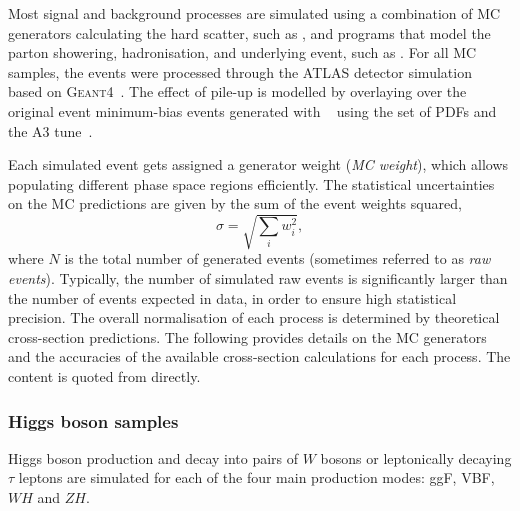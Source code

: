 Most signal and background processes are simulated using a combination of MC generators calculating the hard scatter, such as \Powheg, and programs that model the parton showering, hadronisation, and underlying event, such as \PythiaEight.
For all MC samples, the events were processed through the ATLAS detector simulation~\cite{SOFT-2010-01} based on
\textsc{Geant4}~\cite{Agostinelli:2002hh}.\cite{PLACEHOLDER:FOR:PAPER} 
The effect of pile-up is modelled by overlaying over the original event minimum-bias events generated with ~\cite{Sjostrand:2007gs} using the \nnpdftwo set of PDFs and the A3 tune~\cite{ATL-PHYS-PUB-2016-017}.


Each simulated event gets assigned a generator weight (\emph{MC weight}), which allows populating different phase space regions efficiently.
The statistical uncertainties on the MC predictions are given by the sum of the event weights squared,
\begin{equation}
    \sigma = \sqrt{\sum_i w_i^2},
\end{equation}
where $N$ is the total number of generated events (sometimes referred to as \emph{raw events}). Typically, the number of simulated raw events is significantly larger than the number of events expected in data, in order to ensure high statistical precision. 
The overall normalisation of each process is determined by theoretical cross-section predictions.
The following provides details on the MC generators and the accuracies of the available cross-section calculations for each process. The content is quoted from \cite{PLACEHOLDER:FOR:PAPER} directly.


\subsubsection{Higgs boson samples}
Higgs boson production and decay into pairs of $W$ bosons or leptonically decaying $\tau$ leptons are simulated for each of the four main production modes: ggF, VBF, $WH$ and $ZH$.

